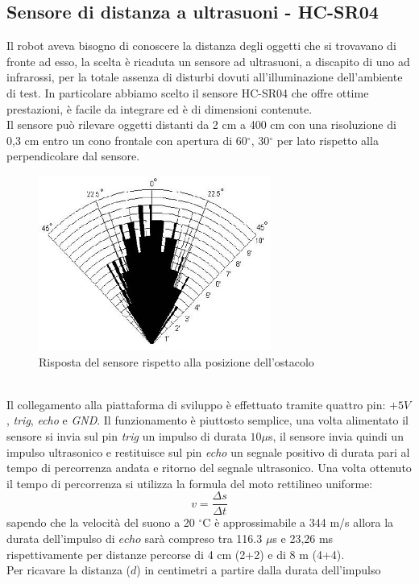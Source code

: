 \subsection{Sensore di distanza a ultrasuoni - HC-SR04}
Il robot aveva bisogno di conoscere la distanza degli oggetti che si trovavano 
di fronte ad esso, la scelta è ricaduta un sensore ad ultrasuoni, a discapito di
 uno ad infrarossi, per la totale assenza di disturbi dovuti all'illuminazione 
 dell'ambiente di test. In particolare abbiamo scelto il sensore HC-SR04 che 
 offre ottime prestazioni, è facile da integrare ed è di dimensioni contenute.\\
Il sensore può rilevare oggetti distanti da 2 cm a 400 cm con una risoluzione 
di 0,3 cm entro un cono frontale con apertura di 60$^\circ$, 30$^\circ$ per lato 
rispetto alla perpendicolare dal sensore.
\begin{figure}[!htb] \center
\includegraphics[scale=0.6]{immagini/HC-SR04_Angle.png}
\caption{Risposta del sensore rispetto alla posizione dell'ostacolo} 
\end{figure}
\\Il collegamento alla piattaforma di sviluppo è effettuato tramite quattro pin: 
\textit{$+5V$}, \textit{trig}, \textit{echo} e \textit{GND}.
Il funzionamento è piuttosto semplice, una volta alimentato il sensore si invia 
sul pin \textit{trig} un impulso di durata $10 \mu$s, il sensore invia 
quindi un impulso ultrasonico e restituisce sul pin \textit{echo} un segnale 
positivo di durata pari al tempo di percorrenza andata e ritorno del segnale 
ultrasonico. Una volta ottenuto il tempo di percorrenza si utilizza la formula 
del moto rettilineo uniforme:
$$v = \frac{\Delta s}{\Delta t}$$
sapendo che la velocità del suono a 20 $^\circ$C è approssimabile a 344 m/s allora 
la durata dell'impulso di $echo$ sarà compreso tra 116.3 $\mu$s e 23,26 ms 
rispettivamente per distanze percorse di 4 cm (2+2) e di 8 m (4+4).
\\Per ricavare la distanza ($d$) in centimetri a partire dalla durata dell'impulso 
